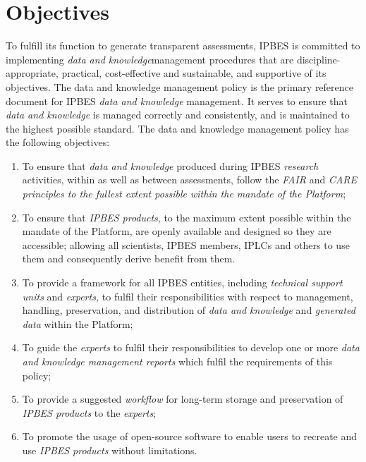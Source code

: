 \documentclass{article}
\begin{document}
\section*{Objectives}

To fulfill its function to generate transparent assessments, IPBES is committed to implementing \textit{data and knowledge}management procedures that are discipline-appropriate, practical, cost-effective and sustainable, and supportive of its objectives. The data and knowledge management policy is the primary reference document for IPBES \textit{data and knowledge }management\textit{.} It serves to ensure that \textit{data and knowledge} is managed correctly and consistently, and is maintained to the highest possible standard. The data and knowledge management policy has the following objectives: 

\begin{enumerate}[label=(\alph*)]
    \item To ensure that \textit{data and knowledge} produced during IPBES \textit{research }activities, within as well as between assessments, follow the \textit{FAIR }and \textit{CARE principles to the fullest extent possible within the mandate of the Platform};
    \item To ensure that \textit{IPBES products}, to the maximum extent possible within the mandate of the Platform, are openly available and designed so they are accessible; allowing all scientists, IPBES members, IPLCs and others to use them and consequently derive benefit from them.
    \item To provide a framework for all IPBES entities, including \textit{technical support units} and \textit{experts, }to fulfil their responsibilities with respect to management, handling, preservation, and distribution of \textit{data and knowledge }and \textit{generated data} within the Platform;
    \item To guide the \textit{experts }to fulfil their responsibilities to develop one or more \textit{data and knowledge management reports }which fulfil the requirements of this policy;
    \item To provide a suggested \textit{workflow} for long-term storage and preservation of \textit{IPBES products} to the \textit{experts};
    \item To promote the usage of open-source software to enable users to recreate and use \textit{IPBES products} without limitations.
\end{enumerate}
\end{document}
